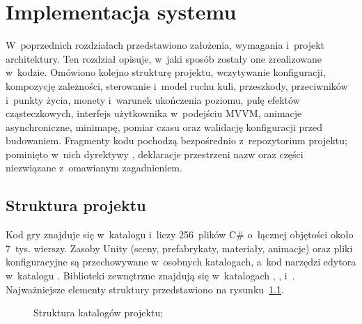 \chapter{Implementacja systemu}
\label{rozdz:implementacja}

W~poprzednich rozdziałach przedstawiono założenia, wymagania i~projekt architektury.
Ten rozdział opisuje, w~jaki sposób zostały one zrealizowane w~kodzie. Omówiono kolejno
strukturę projektu, wczytywanie konfiguracji, kompozycję zależności, sterowanie i~model
ruchu kuli, przeszkody, przeciwników i~punkty życia, monety i~warunek ukończenia poziomu,
pulę efektów cząsteczkowych, interfejs użytkownika w~podejściu MVVM, animacje
asynchroniczne, minimapę, pomiar czasu oraz walidację konfiguracji przed budowaniem. Fragmenty
kodu pochodzą bezpośrednio z~repozytorium projektu; pominięto w~nich dyrektywy
, deklaracje przestrzeni nazw oraz części niezwiązane z~omawianym zagadnieniem.

\section{Struktura projektu}

Kod gry znajduje się w~katalogu  i~liczy 256~plików C\# o~łącznej
objętości około 7~tys. wierszy. Zasoby Unity (sceny, prefabrykaty, materiały, animacje)
oraz pliki konfiguracyjne są przechowywane w~osobnych katalogach, a~kod narzędzi edytora
w~katalogu . Biblioteki
zewnętrzne znajdują się w~katalogach , , 
i~. Najważniejsze elementy struktury przedstawiono na
rysunku~\ref{rys:struktura}.

\begin{figure}[!htb]
  \centering
  \begin{minipage}{0.92\textwidth}
  \end{minipage}
  \caption{Struktura katalogów projektu; \zrodloWlasne}
  \label{rys:struktura}
\end{figure}

